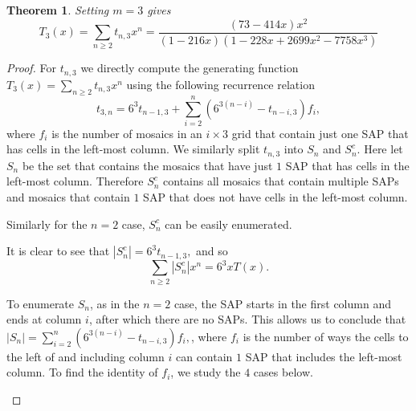\documentclass[12pt]{article}
\newtheorem{theorem}{Theorem}
\theoremstyle{plain}
\theoremstyle{definition}
\theoremstyle{remark}
\theoremstyle{definition}
\newcommand{\cellopen}[4]{ \draw[thick] ( #1 , #2 ) rectangle ( #3 , #4 ); \node[shape=circle,draw=red,fill=red, inner sep=0pt,minimum size=3pt] (A) at ( #1 * 0.5 + #3 * 0.5 , #2 * 0.5 + #4 * 0.5 ){};}
\newcommand{\cellA}[4]{ \draw[thick] ( #1 , #2 ) rectangle ( #3 , #4 ); \draw[red, thick] (#3 * 0.5 + #1 * 0.5 , #2) -- (#3, #4 * 0.5 + #2 * 0.5);}
\newcommand{\cellD}[4]{ \draw[thick] ( #1 , #2 ) rectangle ( #3 , #4 ); \draw[red, thick] (#3 * 0.5 + #1 * 0.5 , #4) -- (#3, #4 * 0.5 + #2 * 0.5);}
\begin{document}
\begin{theorem}\label{thm: m=3 case}
Setting $m=3$ gives
\begin{equation}
    T_3(x) = \sum_{n \geq 2}t_{n,3}x^n = \frac{(73-414x)x^2}{(1-216x)(1-228x+2699x^2-7758x^3)}
\end{equation}
\end{theorem}

\begin{proof}
For $t_{n,3}$ we directly compute the generating function $T_3(x)=\sum_{n \geq 2}t_{n,3}x^n$ using the following recurrence relation
$$t_{3,n} = 6^3 t_{n-1,3} + \sum_{i = 2}^{n}(6^{3(n-i)} - t_{n-i,3})f_{i},$$
where $f_{i}$ is the number of mosaics in an $i \times 3$ grid  that contain just one SAP that has cells in the left-most column. We similarly split $t_{n,3}$ into $S_n$ and $S_n^c$. Here let $S_n$ be the set that contains the mosaics that have just $1$ SAP that has cells in the left-most column. Therefore $S_n^c$ contains all mosaics that contain multiple SAPs and mosaics that contain $1$ SAP that does not have cells in the left-most column. 

Similarly for the $n=2$ case, $S_n^c$ can be easily enumerated. 
\begin{center}
    \label{fig: Sc breakdown for 3}
\end{center}

It is clear to see that $|S_n^c| = 6^3 t_{n-1,3},$ and so 
$$\sum_{n \geq 2} |S_n^c|x^n = 6^3 xT(x).$$

To enumerate $S_n$, as in the $n=2$ case, the SAP starts in the first column and ends at column $i$, after which there are no SAPs. This allows us to conclude that $|S_n| = \sum_{i = 2}^{n}(6^{3(n-i)} - t_{n-i,3})f_{i},$, where $f_i$ is the number of ways the cells to the left of and including column $i$ can contain $1$ SAP that includes the left-most column. To find the identity of $f_i$, we study the $4$ cases below.

\begin{center}
\end{center}
\end{proof}
\end{document}
